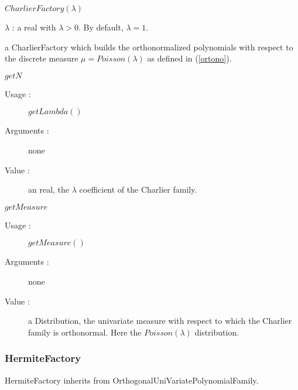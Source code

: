 \begin{description}
\item[Usage :] $CharlierFactory(\lambda)$


\item[Arguments :]  $\lambda$ : a real with $\lambda > 0$. By default, $\lambda = 1$.


\item[Value :]  a CharlierFactory which builds the orthonormalized polynomials with respect to the discrete measure $\mu =Poisson(\lambda)$ as defined in (\ref{ortono}).

\item[Some methods :]  \rule{0pt}{1em}

  \begin{description}
  
  \item $getN$
    \begin{description}
    \item[Usage :] $getLambda()$
    \item[Arguments :] none
    \item[Value :]  an real, the $\lambda$ coefficient of the Charlier family.
    \end{description}
    \bigskip

  \item $getMeasure$
    \begin{description}
    \item[Usage :] $getMeasure()$
    \item[Arguments :] none
    \item[Value :]  a Distribution, the univariate measure with respect to which the Charlier family is orthonormal. Here the $Poisson(\lambda)$ distribution.
    \end{description}
    \bigskip

  \end{description}
\end{description}



\newpage
\subsubsection{HermiteFactory}

HermiteFactory inherits from OrthogonalUniVariatePolynomialFamily.

